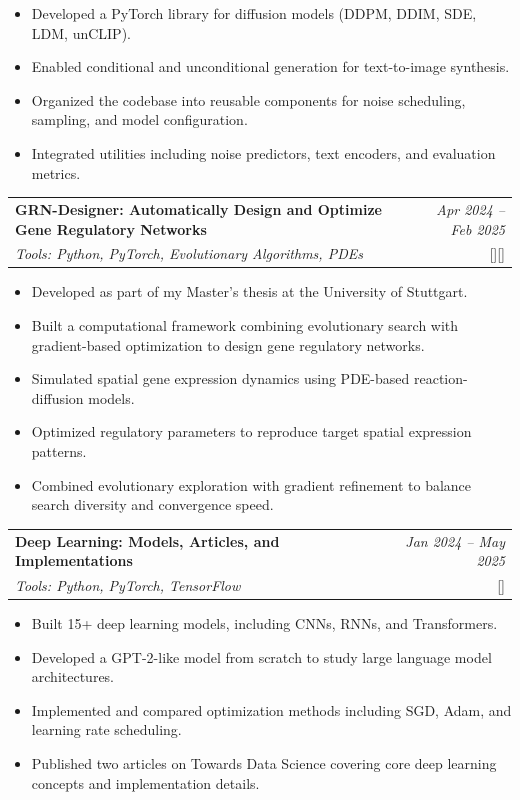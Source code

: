\documentclass[a4paper,11pt]{article}
\makeatletter
\newcommand{\resumeProject}[4]{
\vspace{0.5mm}\item
    \begin{tabular*}{0.98\textwidth}[t]{l@{\extracolsep{\fill}}r}
        \textbf{#1} & \textit{\footnotesize{#3}} \\
        \footnotesize{\textit{#2}} & \footnotesize{#4}
    \end{tabular*}
    \vspace{-2.4mm}
}
\newcommand{\resumeItemListStart}{\begin{itemize}[leftmargin=*,labelsep=1mm,itemsep=0.5mm]}
\newcommand{\resumeItemListEnd}{\end{itemize}\vspace{-2mm}}
\makeatother
\begin{document}
   \resumeItemListStart 
   \item Developed a PyTorch library for diffusion models (DDPM, DDIM, SDE, LDM, unCLIP). 
   \item Enabled conditional and unconditional generation for text-to-image synthesis. 
   \item Organized the codebase into reusable components for noise scheduling, sampling, and model configuration. 
   \item Integrated utilities including noise predictors, text encoders, and evaluation metrics. 
\resumeItemListEnd


\resumeProject
  {GRN-Designer: Automatically Design and Optimize Gene Regulatory Networks}
  {Tools: Python, PyTorch, Evolutionary Algorithms, PDEs}
  {Apr 2024 -- Feb 2025}
  {[\href{https://loqmansamani.github.io/grn-designer/}{\textcolor{darkblue}{\faGlobe}}][\href{https://github.com/LoqmanSamani/grn-designer}{\textcolor{darkblue}{\faGithub}}]}  

\resumeItemListStart
  \item Developed as part of my Master's thesis at the University of Stuttgart.
  \item Built a computational framework combining evolutionary search with gradient-based optimization to design gene regulatory networks.
  \item Simulated spatial gene expression dynamics using PDE-based reaction-diffusion models.
  \item Optimized regulatory parameters to reproduce target spatial expression patterns.
  \item Combined evolutionary exploration with gradient refinement to balance search diversity and convergence speed.
\resumeItemListEnd



\resumeProject
  {Deep Learning: Models, Articles, and Implementations}
  {Tools: Python, PyTorch, TensorFlow}
  {Jan 2024 -- May 2025}
  {{}[\href{https://github.com/LoqmanSamani/deep-learning}{\textcolor{darkblue}{\faGithub}}]}  

\resumeItemListStart
  \item Built 15+ deep learning models, including CNNs, RNNs, and Transformers.  
  \item Developed a GPT-2-like model from scratch to study large language model architectures.  
  \item Implemented and compared optimization methods including SGD, Adam, and learning rate scheduling.  
  \item Published two articles on Towards Data Science covering core deep learning concepts and implementation details.  
\resumeItemListEnd
\end{document}
